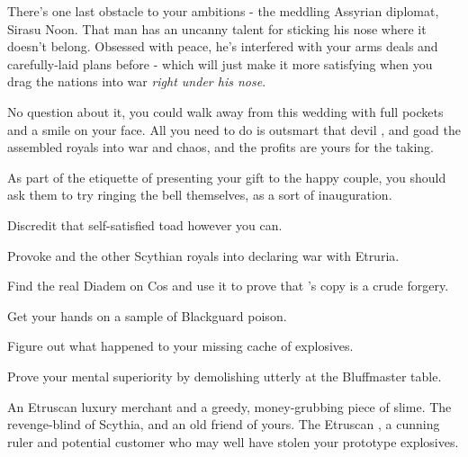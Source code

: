 \documentclass[char]{Kos}
\begin{document}
There's one last obstacle to your ambitions - the meddling Assyrian diplomat, Sirasu Noon. That man has an uncanny talent for sticking his nose where it doesn't belong. Obsessed with peace, he's interfered with your arms deals and carefully-laid plans before - which will just make it more satisfying when you drag the nations into war \emph{right under his nose}.

No question about it, you could walk away from this wedding with full pockets and a smile on your face. All you need to do is outsmart that devil \cMerchant{}, and goad the assembled royals into war and chaos, and the profits are yours for the taking.

\begin{itemz}[Notes]
  \item As part of the etiquette of presenting your gift to the happy couple, you should ask them to try ringing the bell themselves, as a sort of inauguration.
\end{itemz}

\begin{itemz}[Goals]
\item Discredit that self-satisfied toad \cMerchant{} however you can.
\item Provoke \cScythiaQueen{\Monarch} \cScythiaQueen{} and the other Scythian royals into declaring war with Etruria.
\item Find the real Diadem on Cos and use it to prove that \cMerchant{}'s copy is a crude forgery.
\item Get your hands on a sample of Blackguard poison.
\item Figure out what happened to your missing cache of explosives.
\item Prove your mental superiority by demolishing \cMerchant{} utterly at the Bluffmaster table.
\end{itemz}

\begin{contacts}
\contact{\cMerchant{}} An Etruscan luxury merchant and a greedy, money-grubbing piece of slime.
\contact{\cScythiaQueen{}} The revenge-blind \cScythiaQueen{\monarch} of Scythia, and an old friend of yours.
\contact{\cEtruriaKing{}} The Etruscan \cEtruriaKing{\monarch}, a cunning ruler and potential customer who may well have stolen your prototype explosives.
\end{contacts}
\end{document}
